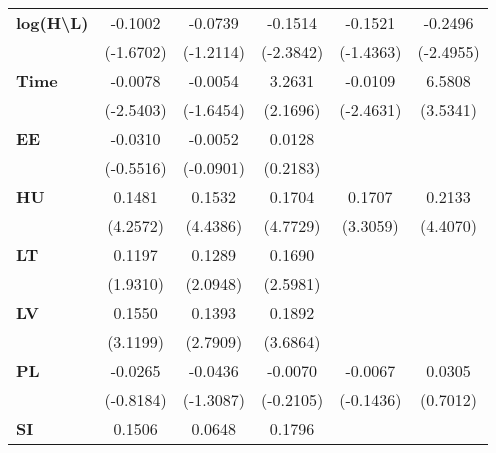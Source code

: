 \documentclass{article}
\begin{document}
\begin{table}[!htbp]
{\begin{tabular}{lccccc}
\textbf{log(H\textbackslash L)}             &     -0.1002     &        -0.0739        &     -0.1514      &      -0.1521      &        -0.2496         \\
\textbf{ }                     &    (-1.6702)    &       (-1.2114)       &    (-2.3842)     &     (-1.4363)     &       (-2.4955)        \\
\textbf{Time}                 &     -0.0078     &        -0.0054        &      3.2631      &      -0.0109      &         6.5808         \\
\textbf{ }                     &    (-2.5403)    &       (-1.6454)       &     (2.1696)     &     (-2.4631)     &        (3.5341)        \\
\textbf{EE}            &     -0.0310     &        -0.0052        &      0.0128      &                   &                        \\
\textbf{ }                     &    (-0.5516)    &       (-0.0901)       &     (0.2183)     &                   &                        \\
\textbf{HU}            &      0.1481     &         0.1532        &      0.1704      &       0.1707      &         0.2133         \\
\textbf{ }                     &     (4.2572)    &        (4.4386)       &     (4.7729)     &      (3.3059)     &        (4.4070)        \\
\textbf{LT}            &      0.1197     &         0.1289        &      0.1690      &                   &                        \\
\textbf{ }                     &     (1.9310)    &        (2.0948)       &     (2.5981)     &                   &                        \\
\textbf{LV}            &      0.1550     &         0.1393        &      0.1892      &                   &                        \\
\textbf{ }                     &     (3.1199)    &        (2.7909)       &     (3.6864)     &                   &                        \\
\textbf{PL}            &     -0.0265     &        -0.0436        &     -0.0070      &      -0.0067      &         0.0305         \\
\textbf{ }                     &    (-0.8184)    &       (-1.3087)       &    (-0.2105)     &     (-0.1436)     &        (0.7012)        \\
\textbf{SI}            &      0.1506     &         0.0648        &      0.1796      &                   &                        \\

\end{tabular}}
\end{table}
\end{document}
